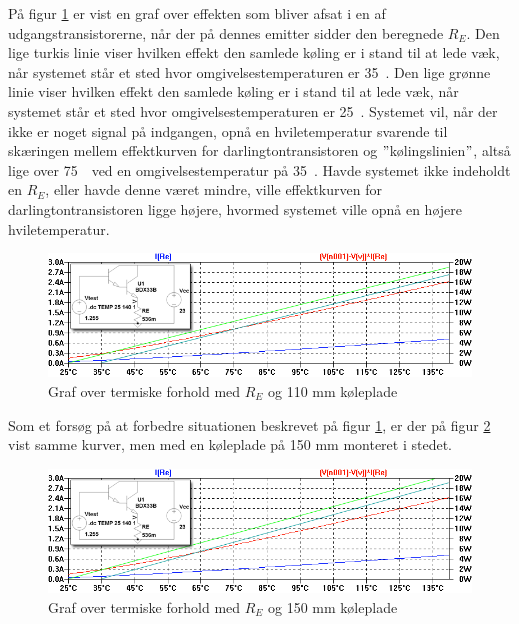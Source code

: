 På figur \ref{fig:term-runaway} er vist en graf over effekten som bliver afsat i en af udgangstransistorerne, når der på dennes emitter sidder den beregnede $R_E$. Den lige turkis linie viser hvilken effekt den samlede køling er i stand til at lede væk, når systemet står et sted hvor omgivelsestemperaturen er 35~\celsius. Den lige grønne linie viser hvilken effekt den samlede køling er i stand til at lede væk, når systemet står et sted hvor omgivelsestemperaturen er 25~\celsius. Systemet vil, når der ikke er noget signal på indgangen, opnå en hviletemperatur svarende til skæringen mellem effektkurven for darlingtontransistoren og $"$kølingslinien$"$, altså lige over 75~\celsius~ved en omgivelsestemperatur på 35~\celsius. Havde systemet ikke indeholdt en $R_E$, eller havde denne været mindre, ville effektkurven for darlingtontransistoren ligge højere, hvormed systemet ville opnå en højere hviletemperatur. 

\begin{figure}[h]
\centering
\includegraphics[width=\textwidth]{teknisk/effektforstaerker/term-runaway.png}
\caption{Graf over termiske forhold med $R_E$ og 110 mm køleplade}
\label{fig:term-runaway}
\end{figure}

Som et forsøg på at forbedre situationen beskrevet på figur \ref{fig:term-runaway}, er der på figur \ref{fig:term-runaway1} vist samme kurver, men med en køleplade på 150 mm monteret i stedet. 

\begin{figure}[h]
\centering
\includegraphics[width=\textwidth]{teknisk/effektforstaerker/term-runaway1.png}
\caption{Graf over termiske forhold med $R_E$ og 150 mm køleplade}
\label{fig:term-runaway1}
\end{figure}

